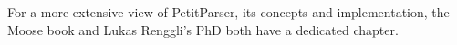 \documentclass[a4paper,10pt,twoside]{book}
\begin{document}
For a more 
extensive view of PetitParser, its concepts and implementation, the Moose 
book\footnotemark{} and Lukas Renggli's PhD\footnotemark{} both have a dedicated 
chapter.


\ifx\wholebook\relax\else

\label{cha:glamour}


\end{document}
